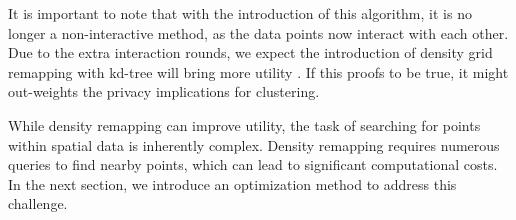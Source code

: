 {%



It is important to note that with the introduction of this algorithm, it is no longer a non-interactive method, as the data points now interact with each other.
Due to the extra interaction rounds, we expect the introduction of density grid remapping with kd-tree will bring more utility \citep{wang_comprehensive_2020, xiongComprehensiveSurveyLocal2020}.
If this proofs to be true, it might out-weights the privacy implications for clustering.  \newline

While density remapping can improve utility, the task of searching for points within spatial data is inherently complex. Density remapping requires numerous queries to find nearby points, which can lead to significant computational costs. In the next section, we introduce an optimization method to address this challenge.

}
